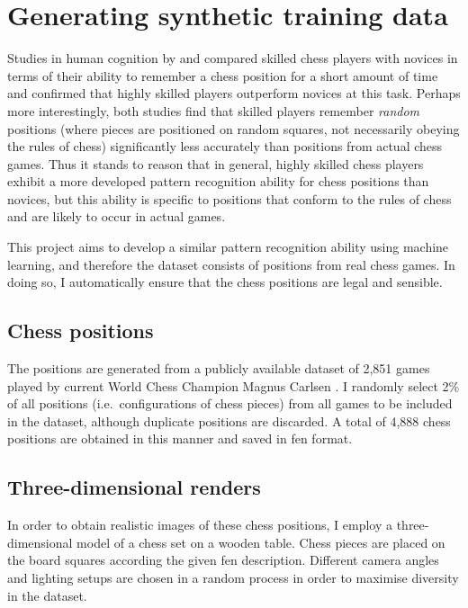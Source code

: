 \documentclass[../report.tex]{subfiles}
\begin{document}
\chapter{Generating synthetic training data}
\label{chap:data_synthesis}

Studies in human cognition by \textcite{bilalic2010} and \textcite{zhou2018} compared skilled chess players with novices in terms of their ability to remember a chess position for a short amount of time and confirmed that highly skilled players outperform novices at this task.
Perhaps more interestingly, both studies find that skilled players remember \emph{random} positions (where pieces are positioned on random squares, not necessarily obeying the rules of chess) significantly less accurately than positions from actual chess games. 
Thus it stands to reason that in general, highly skilled chess players exhibit a more developed pattern recognition ability for chess positions than novices, but this ability is specific to positions that conform to the rules of chess and are likely to occur in actual games.

This project aims to develop a similar pattern recognition ability using machine learning, and therefore the dataset consists of positions from real chess games. 
In doing so, I automatically ensure that the chess positions are legal and sensible.

\section{Chess positions}
\label{sec:data_chess_positions}
The positions are generated from a publicly available dataset of 2,851 games played by current World Chess Champion Magnus Carlsen \cite{64squares2020}.
I randomly select 2\% of all positions (i.e.\ configurations of chess pieces) from all games to be included in the dataset, although duplicate positions are discarded.
A total of 4,888 chess positions are obtained in this manner and saved in \gls{fen} format.

\section{Three-dimensional renders}
\label{sec:3d_renders}
In order to obtain realistic images of these chess positions, I employ a three-dimensional model of a chess set on a wooden table. 
Chess pieces are placed on the board squares according the given \gls{fen} description. 
Different camera angles and lighting setups are chosen in a random process in order to maximise diversity in the dataset.
\end{document}
